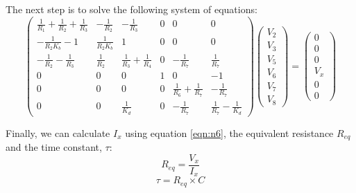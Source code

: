 The next step is to solve the following system of equations:
\begin{equation}
\left(\begin{array}{cccccc} \frac{1}{R_1}+\frac{1}{R_2} +\frac{1}{R_3} & -\frac{1}{R_2} & -\frac{1}{R_3} & 0 & 0 & 0\\ -\frac{1}{R_2 K_b}-1 & \frac{1}{R_2 K_b} & 1 & 0 & 0 & 0 \\ -\frac{1}{R_2}-\frac{1}{R_3} & \frac{1}{R_2} & \frac{1}{R_3}+\frac{1}{R_4} & 0& -\frac{1}{R_7} &\frac{1}{R_7} \\ 0&0&0&1&0&-1\\0&0&0&0&\frac{1}{R_6}+\frac{1}{R_7}&-\frac{1}{R_7} \\ 0&0&\frac{1}{K_d}&0&-\frac{1}{R_7}&\frac{1}{R_7}-\frac{1}{K_d}\end{array}\right)
\left(\begin{array}{c} V_2 \\ V_3 \\ V_5 \\ V_6 \\ V_7 \\ V_8 \end{array}\right) 
= \left(\begin{array}{c} 0 \\ 0 \\ 0 \\ V_x \\ 0 \\ 0 \end{array}\right)
\end{equation}

Finally, we can calculate $I_x$ using equation \eqref{eqn:n6}, the equivalent resistance $R_{eq}$ and the time constant, $\tau$: 
\begin{equation}
R_{eq}=\frac{V_x}{I_x}
\end{equation}
\begin{equation}
\tau=R_{eq}\times C
\end{equation}
